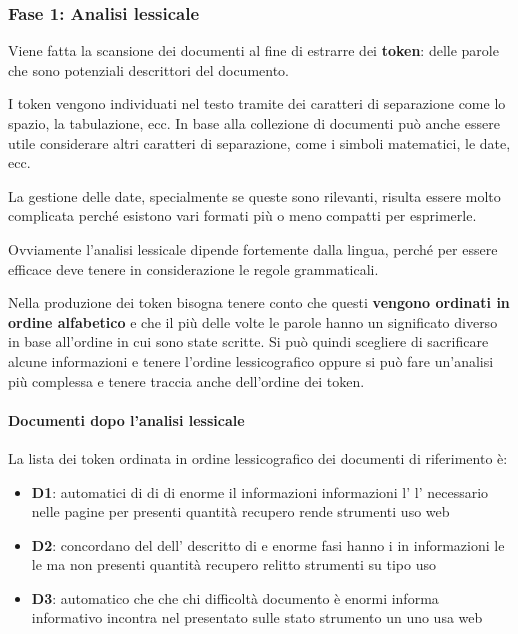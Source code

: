 \subsubsection{Fase 1: Analisi lessicale}

Viene fatta la scansione dei documenti al fine di estrarre dei \textbf{token}: delle parole che sono potenziali descrittori del documento.

I token vengono individuati nel testo tramite dei caratteri di separazione come lo spazio, la tabulazione, ecc. In base alla collezione di documenti può anche essere utile considerare altri caratteri di separazione, come i simboli matematici, le date, ecc.

La gestione delle date, specialmente se queste sono rilevanti, risulta essere molto complicata perché esistono vari formati più o meno compatti per esprimerle.

Ovviamente l'analisi lessicale dipende fortemente dalla lingua, perché per essere efficace deve tenere in considerazione le regole grammaticali.

Nella produzione dei token bisogna tenere conto che questi \textbf{vengono ordinati in ordine alfabetico} e che il più delle volte le parole hanno un significato diverso in base all'ordine in cui sono state scritte. 
Si può quindi scegliere di sacrificare alcune informazioni e tenere l'ordine lessicografico oppure si può fare un'analisi più complessa e tenere traccia anche dell'ordine dei token.

\paragraph{Documenti dopo l'analisi lessicale} La lista dei token ordinata in ordine lessicografico dei documenti di riferimento è:

\begin{itemize}
	\item \textbf{D1}: automatici di di di enorme il informazioni
	informazioni l' l' necessario nelle pagine per presenti quantità recupero rende strumenti uso web
	\item \textbf{D2}: concordano del dell' descritto di e enorme fasi hanno i in informazioni le le ma non presenti quantità recupero relitto strumenti su tipo uso 
	\item \textbf{D3}: automatico che che chi difficoltà documento è enormi informa informativo incontra nel presentato sulle stato strumento un uno usa web 
\end{itemize}

